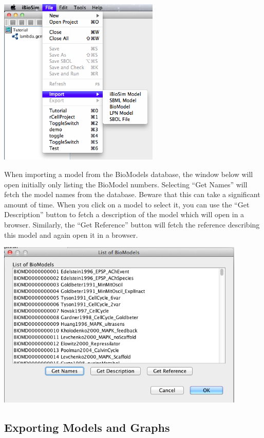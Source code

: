\documentclass[titlepage,11pt]{article}
\begin{document}
\begin{center}
\includegraphics[height=80mm]{screenshots/import}
\end{center} 

When importing a model from the BioModels database, the window below will open initially only listing the BioModel numbers.  Selecting ``Get Names'' will fetch the model names from the database.  Beware that this can take a significant amount of time.  When you click on a model to select it, you can use the ``Get Description'' button to fetch a description of the model which will open in a browser.  Similarly, the ``Get Reference'' button will fetch the reference describing this model and again open it in a browser.

\begin{center}
\includegraphics[height=80mm]{screenshots/BioModels}
\end{center} 

\subsection{Exporting Models and Graphs}
\end{document}
